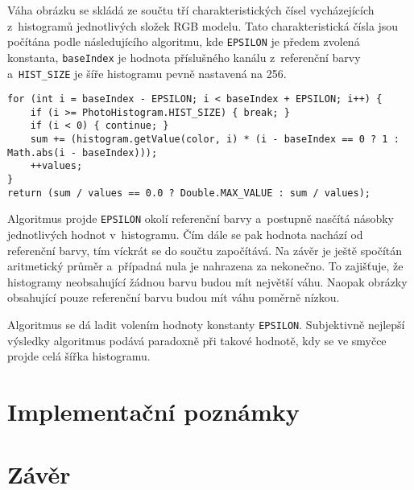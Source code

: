 \documentclass[12pt,oneside,a4paper]{article}
\newenvironment{listing}
{\begin{list}{}{\setlength{\leftmargin}{1em}}\item\scriptsize\bfseries}
{\end{list}}
\begin{document}
Váha obrázku se skládá ze součtu tří charakteristických čísel vycházejících z~histogramů jednotlivých složek RGB modelu. Tato charakteristická čísla jsou počítána podle následujícího algoritmu, kde \texttt{EPSILON} je předem zvolená konstanta, \texttt{baseIndex} je hodnota příslušného kanálu z~referenční barvy a~\texttt{HIST\_SIZE} je šíře histogramu pevně nastavená na 256.

\begin{listing}
\begin{verbatim}
for (int i = baseIndex - EPSILON; i < baseIndex + EPSILON; i++) {
    if (i >= PhotoHistogram.HIST_SIZE) { break; }
    if (i < 0) { continue; }
    sum += (histogram.getValue(color, i) * (i - baseIndex == 0 ? 1 : Math.abs(i - baseIndex)));
    ++values;
}
return (sum / values == 0.0 ? Double.MAX_VALUE : sum / values);
\end{verbatim}
\end{listing}

Algoritmus projde \texttt{EPSILON} okolí referenční barvy a~postupně nasčítá násobky jednotlivých hodnot v~histogramu. Čím dále se pak hodnota nachází od referenční barvy, tím víckrát se do součtu započítává. Na závěr je ještě spočítán aritmetický průměr a~případná nula je nahrazena za nekonečno. To zajišťuje, že histogramy neobsahující žádnou barvu budou mít největší váhu. Naopak obrázky obsahující pouze referenční barvu budou mít váhu poměrně nízkou.

Algoritmus se dá ladit volením hodnoty konstanty \texttt{EPSILON}. Subjektivně nejlepší výsledky algoritmus podává paradoxně při takové hodnotě, kdy se ve smyčce projde celá šířka histogramu.

\section{Implementační poznámky}

\section{Závěr}

\renewcommand{\refname}{Literatura}

{
 
}
\end{document}
